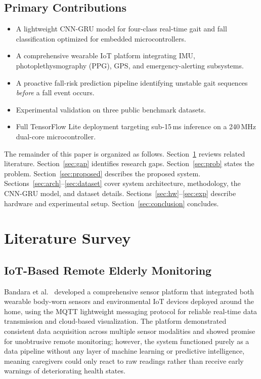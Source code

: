 \documentclass[conference]{IEEEtran}
\begin{document}
\subsection*{Primary Contributions}
\begin{itemize}
  \item A lightweight CNN-GRU model for four-class real-time gait and fall
        classification optimized for embedded microcontrollers.
  \item A comprehensive wearable IoT platform integrating IMU,
        photoplethysmography (PPG), GPS, and emergency-alerting subsystems.
  \item A proactive fall-risk prediction pipeline identifying unstable gait
        sequences \emph{before} a fall event occurs.
  \item Experimental validation on three public benchmark datasets.
  \item Full TensorFlow Lite deployment targeting sub-15\,ms inference on a
        240\,MHz dual-core microcontroller.
\end{itemize}

The remainder of this paper is organized as follows. Section~\ref{sec:lit}
reviews related literature. Section~\ref{sec:gap} identifies research gaps.
Section~\ref{sec:prob} states the problem. Section~\ref{sec:proposed}
describes the proposed system. Sections~\ref{sec:arch}--\ref{sec:dataset}
cover system architecture, methodology, the CNN-GRU model, and dataset
details. Sections~\ref{sec:hw}--\ref{sec:exp} describe hardware and
experimental setup. Section~\ref{sec:conclusion} concludes.

\section{Literature Survey}
\label{sec:lit}

\subsection{IoT-Based Remote Elderly Monitoring}

Bandara et al.~\cite{bandara2020} developed a comprehensive sensor platform
that integrated both wearable body-worn sensors and environmental IoT
devices deployed around the home, using the MQTT lightweight messaging
protocol for reliable real-time data transmission and cloud-based
visualization. The platform demonstrated consistent data acquisition across
multiple sensor modalities and showed promise for unobtrusive remote
monitoring; however, the system functioned purely as a data pipeline without
any layer of machine learning or predictive intelligence, meaning
caregivers could only react to raw readings rather than receive early
warnings of deteriorating health states.
\end{document}
